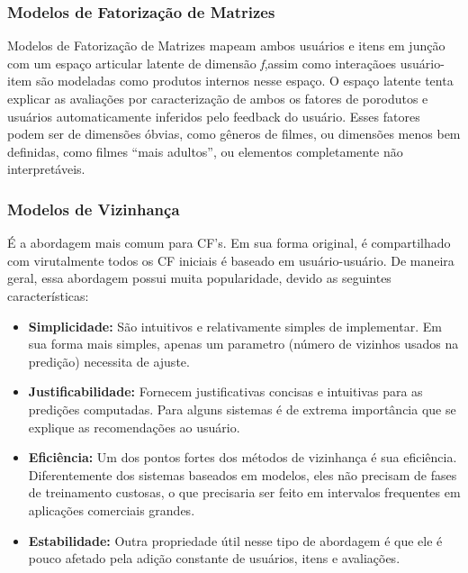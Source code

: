 \subsubsection{Modelos de Fatorização de Matrizes}

\par
Modelos de Fatorização de Matrizes mapeam ambos usuários e itens em junção com um espaço articular latente de dimensão \textit{f},assim como interaçãoes usuário-item são modeladas como produtos internos nesse espaço. O espaço latente tenta explicar as avaliações por caracterização de ambos os fatores de porodutos e usuários automaticamente inferidos pelo feedback do usuário. Esses fatores podem ser de dimensões óbvias, como gêneros de filmes, ou dimensões menos bem definidas, como filmes ``mais adultos'', ou elementos completamente não interpretáveis.

\subsubsection{Modelos de Vizinhança}
\par
É a abordagem mais comum para CF's. Em sua forma original, é compartilhado com virutalmente todos os CF iniciais é baseado em usuário-usuário. De maneira geral, essa abordagem possui muita popularidade, devido as seguintes características:

\begin{itemize}

  \item \textbf{Simplicidade:} São intuitivos e relativamente simples de implementar. Em sua forma mais simples, apenas um parametro (número de vizinhos usados na predição) necessita de ajuste.
  \item \textbf{Justificabilidade:} Fornecem justificativas concisas e intuitivas para as predições computadas. Para alguns sistemas é de extrema importância que se explique as recomendações ao usuário.
  \item \textbf{Eficiência:} Um dos pontos fortes dos métodos de vizinhança é sua eficiência. Diferentemente dos sistemas baseados em modelos, eles não precisam de fases de treinamento custosas, o que precisaria ser feito em intervalos frequentes em aplicações comerciais grandes.
   \item \textbf{Estabilidade:} Outra propriedade útil nesse tipo de abordagem é que ele é pouco afetado pela adição constante de usuários, itens e avaliações.
\end{itemize}